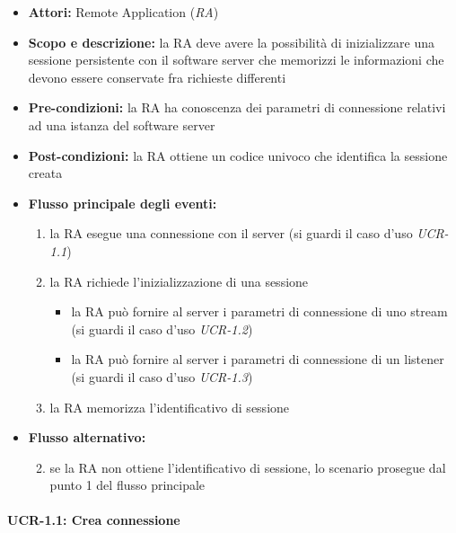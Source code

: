\begin{itemize}
	\item \textbf{Attori:} Remote Application (\emph{RA})
	\item \textbf{Scopo e descrizione:} la RA deve avere la possibilità di inizializzare una sessione persistente con il software server che memorizzi le informazioni che devono essere conservate fra richieste differenti
	\item \textbf{Pre-condizioni:} la RA ha conoscenza dei parametri di connessione relativi ad una istanza del software server
	\item \textbf{Post-condizioni:} la RA ottiene un codice univoco che identifica la sessione creata
	\item \textbf{Flusso principale degli eventi:}
		\begin{enumerate}
			\item la RA esegue una connessione con il server (si guardi il caso d'uso \emph{UCR-1.1})
			\item la RA richiede l'inizializzazione di una sessione
				\begin{itemize}
					\item la RA può fornire al server i parametri di connessione di uno stream (si guardi il caso d'uso \emph{UCR-1.2})
					\item la RA può fornire al server i parametri di connessione di un listener (si guardi il caso d'uso \emph{UCR-1.3})
				\end{itemize}
			\item la RA memorizza l'identificativo di sessione
		\end{enumerate}
	\item \textbf{Flusso alternativo:}
		\begin{enumerate}
			\setcounter{enumi}{1}
			\item se la RA non ottiene l'identificativo di sessione, lo scenario prosegue dal punto 1 del flusso principale
		\end{enumerate}
\end{itemize}


\paragraph{UCR-1.1: Crea connessione}

